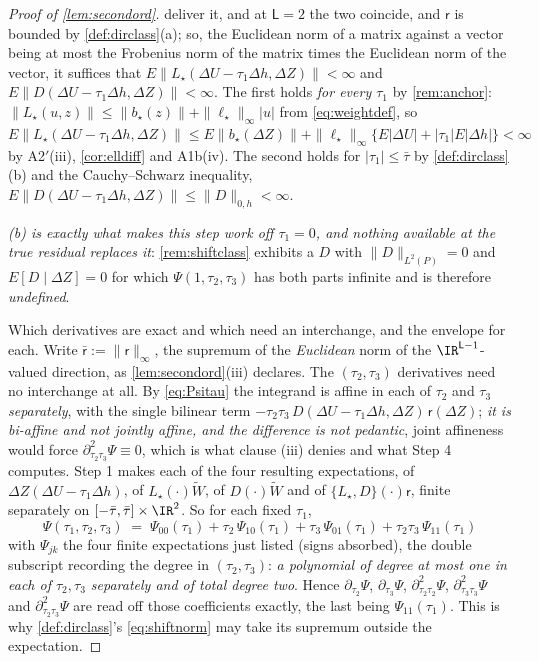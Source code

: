 \begin{proof}[Proof of \cref{lem:secondord}]
{deliver it, and at $\mathsf L=2$ the two coincide}, and $\mathsf r$ is bounded by
\cref{def:dirclass}(a); so, the Euclidean norm of a matrix against a vector being at most the Frobenius
norm of the matrix times the Euclidean norm of the vector, it suffices that
$E\|L_\star(\Delta U-\tau_1\Delta h,\Delta Z)\|<\infty$ and
$E\|D(\Delta U-\tau_1\Delta h,\Delta Z)\|<\infty$. The first holds \emph{for every $\tau_1$} by
\cref{rem:anchor}: $\|L_\star(u,z)\|\le\|b_\star(z)\|+\|\ell_\star\|_\infty|u|$ from
\eqref{eq:weightdef}, so
$E\|L_\star(\Delta U-\tau_1\Delta h,\Delta Z)\|\le E\|b_\star(\Delta Z)\|+\|\ell_\star\|_\infty\{E|\Delta U|+|\tau_1|E|\Delta h|\}<\infty$
by A2$'$(iii), \cref{cor:elldiff} and A1b(iv). The second holds for $|\tau_1|\le\bar\tau$ by
\cref{def:dirclass}(b) and the Cauchy--Schwarz inequality,
$E\|D(\Delta U-\tau_1\Delta h,\Delta Z)\|\le\|D\|_{0,h}<\infty$.

\emph{(b) is exactly what makes this step work off $\tau_1=0$, and nothing available
at the true residual replaces it}: \cref{rem:shiftclass} exhibits a $D$ with $\|D\|_{L^{2}(P)}=0$ and
$E[D\mid\Delta Z]=0$ for which $\Psi(1,\tau_2,\tau_3)$ has both parts infinite and is therefore
\emph{undefined}.

Which derivatives are exact and which need an interchange, and the envelope for each. Write
$\bar{\mathsf r}:=\|\mathsf r\|_\infty$, the supremum of the \emph{Euclidean} norm of the
$\IR^{\mathsf L-1}$-valued direction, as \cref{lem:secondord}\textup{(iii)} declares. The
$(\tau_2,\tau_3)$ derivatives need no interchange at
all. By \eqref{eq:Psitau} the integrand is affine in each of $\tau_2$ and $\tau_3$ \emph{separately},
with the single bilinear term $-\tau_2\tau_3\,D(\Delta U-\tau_1\Delta h,\Delta Z)\,\mathsf r(\Delta Z)$;
\emph{it is bi-affine and not jointly affine, and the difference is not pedantic}, joint affineness
would force $\partial^{2}_{\tau_2\tau_3}\Psi\equiv0$, which is what clause (iii) denies and what Step 4
computes. Step 1 makes each of the four resulting expectations, of $\Delta Z(\Delta U-\tau_1\Delta h)$,
of $L_\star(\cdot)\widetilde W$, of $D(\cdot)\widetilde W$ and of $\{L_\star,D\}(\cdot)\mathsf r$, 
finite separately on $[-\bar\tau,\bar\tau]\times\IR^{2}$. So for each fixed $\tau_1$,
\begin{equation}\label{eq:biaffine}
\Psi(\tau_1,\tau_2,\tau_3)\;=\;\Psi_{00}(\tau_1)+\tau_2\,\Psi_{10}(\tau_1)+\tau_3\,\Psi_{01}(\tau_1)
+\tau_2\tau_3\,\Psi_{11}(\tau_1)
\end{equation}
with $\Psi_{jk}$ the four finite expectations just listed (signs absorbed), the double subscript
recording the degree in $(\tau_2,\tau_3)$: \emph{a polynomial of degree at
most one in each of $\tau_2,\tau_3$ separately and of total degree two}. Hence
$\partial_{\tau_2}\Psi$, $\partial_{\tau_3}\Psi$, $\partial^{2}_{\tau_2\tau_2}\Psi$,
$\partial^{2}_{\tau_3\tau_3}\Psi$ and $\partial^{2}_{\tau_2\tau_3}\Psi$ are read off those coefficients
exactly, the last being $\Psi_{11}(\tau_1)$. This is why \cref{def:dirclass}'s
\eqref{eq:shiftnorm} may take its supremum outside the expectation.


\end{proof}
